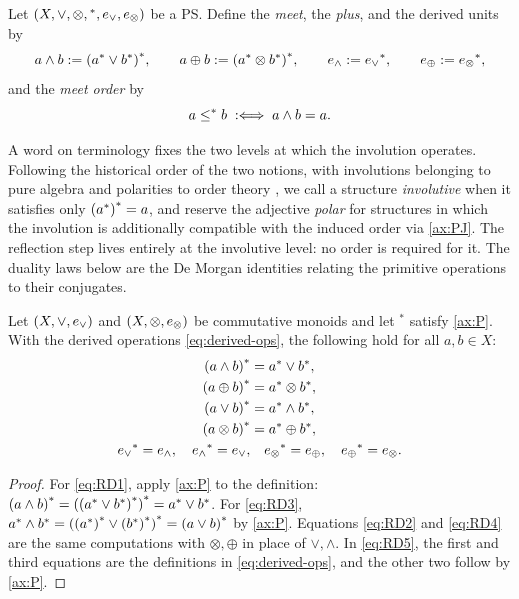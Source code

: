 \begin{definition}\label{def:derived}
Let $(X,\vee,\otimes,{}^{*},e_{\vee},e_{\otimes})$ be a PS. Define the \emph{meet}, the
\emph{plus}, and the derived units by
\begin{equation}\label{eq:derived-ops}
  a \wedge b := {({a}^{*} \vee {b}^{*})}^{*},\qquad
  a \oplus b := {({a}^{*} \otimes {b}^{*})}^{*},\qquad
  e_{\wedge} := {e_{\vee}}^{*},\qquad
  e_{\oplus} := {e_{\otimes}}^{*},
\end{equation}
and the \emph{meet order} by
\begin{equation}\label{eq:meet-order}
  a \leq^{*} b \;:\Longleftrightarrow\; a \wedge b = a.
\end{equation}
\end{definition}

A word on terminology fixes the two levels at which the involution operates.
Following the historical order of the two notions, with involutions
belonging to pure algebra and polarities to order theory
\citep{Birkhoff1940}, we call a structure \emph{involutive} when it satisfies
only ${({a}^{*})}^{*} = a$, and reserve the adjective \emph{polar} for
structures in which the involution is additionally compatible with the
induced order via \eqref{ax:PJ}. The reflection step lives entirely at the
involutive level: no order is required for it. The duality laws below are the
De Morgan identities relating the primitive operations to their conjugates.

\begin{proposition}\label{prop:duality}
Let $(X,\vee,e_{\vee})$ and $(X,\otimes,e_{\otimes})$ be commutative monoids and let
${}^{*}$ satisfy \eqref{ax:P}. With the derived operations
\eqref{eq:derived-ops}, the following hold for all $a,b \in X$:
\begin{align}
  {(a \wedge b)}^{*} &= {a}^{*} \vee {b}^{*}, \label{eq:RD1}\\
  {(a \oplus b)}^{*} &= {a}^{*} \otimes {b}^{*}, \label{eq:RD2}\\
  {(a \vee b)}^{*} &= {a}^{*} \wedge {b}^{*}, \label{eq:RD3}\\
  {(a \otimes b)}^{*} &= {a}^{*} \oplus {b}^{*}, \label{eq:RD4}\\
  {e_{\vee}}^{*} = e_{\wedge},\quad {e_{\wedge}}^{*} = e_{\vee},&\quad
  {e_{\otimes}}^{*} = e_{\oplus},\quad {e_{\oplus}}^{*} = e_{\otimes}. \label{eq:RD5}
\end{align}
\end{proposition}

\begin{proof}
For \eqref{eq:RD1}, apply \eqref{ax:P} to the definition:
${(a \wedge b)}^{*}
 = {({({a}^{*} \vee {b}^{*})}^{*})}^{*}
 = {a}^{*} \vee {b}^{*}$.
For \eqref{eq:RD3},
${a}^{*} \wedge {b}^{*}
 = {({({a}^{*})}^{*} \vee {({b}^{*})}^{*})}^{*}
 = {(a \vee b)}^{*}$ by \eqref{ax:P}. Equations \eqref{eq:RD2} and
\eqref{eq:RD4} are the same computations with $\otimes,\oplus$ in place of
$\vee,\wedge$. In \eqref{eq:RD5}, the first and third equations are the
definitions in \eqref{eq:derived-ops}, and the other two follow by
\eqref{ax:P}.
\end{proof}

